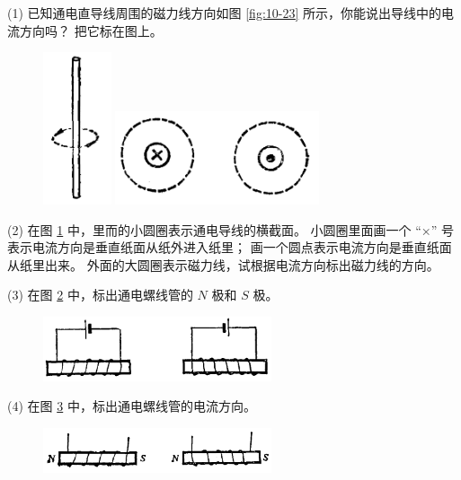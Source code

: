 (1) 已知通电直导线周围的磁力线方向如图 \ref{fig:10-23} 所示，你能说出导线中的电流方向吗？ 把它标在图上。

\begin{figure}[htbp]
    \centering
    \begin{minipage}{7cm}
    \centering
    \includegraphics[width=2cm]{../pic/czwl2-ch10-23}
    \caption{}\label{fig:10-23}
    \end{minipage}
    \qquad
    \begin{minipage}{7cm}
    \centering
    \includegraphics[width=6cm]{../pic/czwl2-ch10-24}
    \caption{}\label{fig:10-24}
    \end{minipage}
\end{figure}


(2) 在图 \ref{fig:10-24} 中，里而的小圆圈表示通电导线的横截面。
小圆圈里面画一个 “×” 号表示电流方向是垂直纸面从纸外进入纸里；
画一个圆点表示电流方向是垂直纸面从纸里出来。
外面的大圆圈表示磁力线，试根据电流方向标出磁力线的方向。

(3) 在图 \ref{fig:10-25} 中，标出通电螺线管的 $N$ 极和 $S$ 极。

\begin{figure}[htbp]
    \centering
    \includegraphics[width=0.6\textwidth]{../pic/czwl2-ch10-25}
    \caption{}\label{fig:10-25}
\end{figure}

(4) 在图 \ref{fig:10-26} 中，标出通电螺线管的电流方向。

\begin{figure}[htbp]
    \centering
    \includegraphics[width=0.6\textwidth]{../pic/czwl2-ch10-26}
    \caption{}\label{fig:10-26}
\end{figure}


